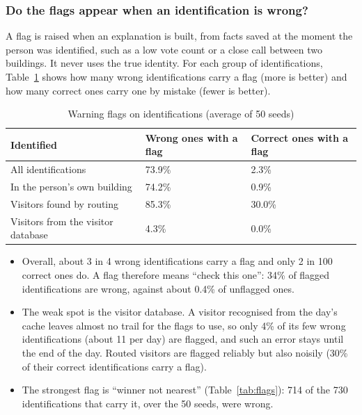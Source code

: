 \documentclass[12pt,a4paper,oneside]{report}
\begin{document}
\subsubsection{Do the flags appear when an identification is wrong?}
A flag is raised when an explanation is built, from facts saved at the moment the person was identified, such as a low vote count or a close call between two buildings. It never uses the true identity. For each group of identifications, Table~\ref{tab:expl-id} shows how many wrong identifications carry a flag (more is better) and how many correct ones carry one by mistake (fewer is better).

\begin{table}[htbp]
\centering
\caption{Warning flags on identifications (average of 50 seeds)}\label{tab:expl-id}
{\small\setlength{\tabcolsep}{4pt}\renewcommand{\arraystretch}{1.2}
\begin{tabular}{|p{5.2cm}|p{4.6cm}|p{4.6cm}|}\hline
\textbf{Identified} & \textbf{Wrong ones with a flag} & \textbf{Correct ones with a flag}\\\hline
All identifications & 73.9\% & 2.3\%\\\hline
In the person's own building & 74.2\% & 0.9\%\\\hline
Visitors found by routing & 85.3\% & 30.0\%\\\hline
Visitors from the visitor database & 4.3\% & 0.0\%\\\hline
\end{tabular}}
\end{table}

\begin{itemize}
\item Overall, about 3 in 4 wrong identifications carry a flag and only 2 in 100 correct ones do. A flag therefore means ``check this one'': 34\% of flagged identifications are wrong, against about 0.4\% of unflagged ones.
\item The weak spot is the visitor database. A visitor recognised from the day's cache leaves almost no trail for the flags to use, so only 4\% of its few wrong identifications (about 11 per day) are flagged, and such an error stays until the end of the day. Routed visitors are flagged reliably but also noisily (30\% of their correct identifications carry a flag).
\item The strongest flag is ``winner not nearest'' (Table~\ref{tab:flags}): 714 of the 730 identifications that carry it, over the 50 seeds, were wrong.
\end{itemize}
\end{document}
